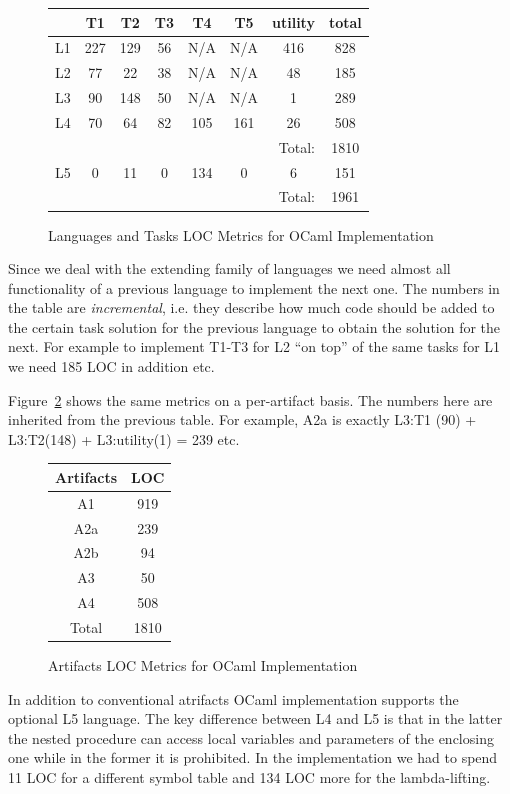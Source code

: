 \begin{figure}
\centering
\begin{tabular}{|c||c|c|c|c|c|c||c|}
\hline
 & T1 & T2 & T3 & T4 & T5 & utility & total \\
\hline
\hline
L1 & 227 & 129 & 56 & N/A & N/A & 416 & 828 \\
L2 & 77 & 22 & 38 & N/A & N/A & 48 & 185 \\
L3 & 90 & 148 & 50 & N/A & N/A & 1 & 289 \\
L4 & 70 & 64 & 82 & 105 & 161 & 26 & 508 \\
\hline
\multicolumn{7}{|r||}{Total:} & 1810 \\
\hline
L5 & 0 & 11 & 0 & 134 & 0 & 6 & 151 \\
\hline
\multicolumn{7}{|r||}{Total:} & 1961 \\
\hline
\end{tabular}
\caption{Languages and Tasks LOC Metrics for OCaml Implementation}
\label{OCamlmap}
\end{figure}

Since we deal with the extending family of languages we need almost all functionality of a previous language 
to implement the next one. The numbers in the table are \emph{incremental}, i.e. they describe how much code 
should be added to the certain task solution for the previous language to obtain the solution for the next. 
For example to implement T1-T3 for L2 ``on top'' of the same tasks for L1 we need 185 LOC in addition etc.

Figure~\ref{OCamlarts} shows the same metrics on a per-artifact basis. The numbers here are inherited from
the previous table. For example, A2a is exactly L3:T1 (90) + L3:T2(148) + L3:utility(1) = 239 etc.

\begin{figure}
\centering
\begin{tabular}{|c||c|}
\hline
Artifacts & LOC \\
\hline
\hline
A1 & 919 \\
A2a & 239 \\
A2b & 94 \\
A3 & 50 \\
A4 & 508 \\
\hline
\hline
Total & 1810 \\
\hline
\end{tabular}
\caption{Artifacts LOC Metrics for OCaml Implementation}
\label{OCamlarts}
\end{figure}

In addition to conventional atrifacts OCaml implementation supports the optional L5 language. The key difference 
between L4 and L5 is that in the latter the nested procedure can access local variables and parameters 
of the enclosing one while in the former it is prohibited. In the implementation we had to spend 11 LOC for a 
different symbol table and 134 LOC more for the lambda-lifting.

